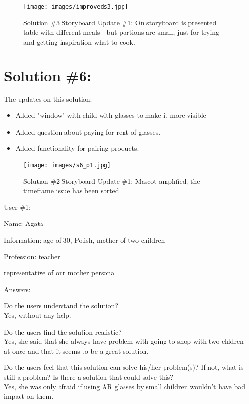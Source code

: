 \documentclass[a4paper,10pt,oneside]{scrreprt}
\begin{document}
\begin{figure}[H]
	\centering
	\texttt{[image: images/improveds3.jpg]}
	\caption{Solution \#3 Storyboard Update \#1: \newline On storyboard is presented table with different meals - but portions are small, just for trying and getting inspiration what to cook.}
\end{figure}
\bigskip
\clearpage

\section{Solution \#6:}
The updates on this solution:
\begin{itemize}
	\item Added "window" with child with glasses to make it more visible.
	\item Added question about paying for rent of glasses.
	\item Added functionality for pairing products.

\end{itemize}

\begin{figure}[H]
	\centering
	\texttt{[image: images/s6\_p1.jpg]}
	\caption{Solution \#2 Storyboard Update \#1: \newline Mascot amplified, the timeframe issue has been sorted}
\end{figure}

User \#1:
\begin{compactitem}
	\item Name: Agata
	\item Information: age of 30, Polish, mother of two children
	\item Profession: teacher
	\item representative of our mother persona
\end{compactitem}
\bigskip

Answers:
\begin{compactitem}
	\item Do the users understand the solution?\\
	Yes, without any help.
	
	\item Do the users find the solution realistic?\\
	Yes, she said that she always have problem with going to shop with two chldren at once and that it seems to be a great solution.
	
	\item Do the users feel that this solution can solve his/her problem(s)? If not, what is still
	a problem? Is there a solution that could solve this?\\
	Yes, she was only afraid if using AR glasses by small children wouldn't have bad impact on them.

\end{compactitem}
\bigskip
\end{document}
